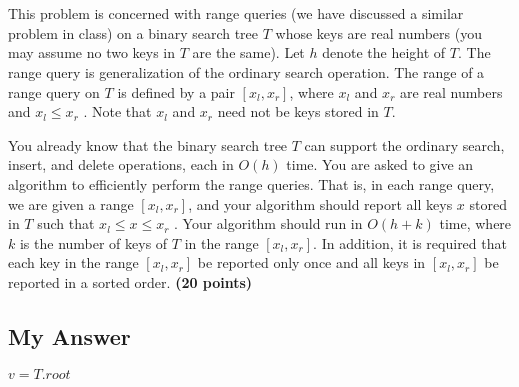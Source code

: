 \documentclass{article}
\begin{document}
\section{}

 This problem is concerned with range queries (we have discussed a
 similar problem in class) on a binary search tree $T$ whose keys are
 real numbers (you may assume no two keys in $T$ are the same). Let
 $h$ denote the height of $T$. The range query is generalization of
 the ordinary search operation. The range of a range query on $T$ is
 defined by a pair $[x_l ,x_r ]$, where $x_l$ and $x_r$ are real
 numbers and $x_l \le x_r$ . Note that $x_l$ and $x_r$ need not be
 keys stored in $T$. 

You already know that the binary search tree $T$ can support the
ordinary search, insert, and delete operations, each in $O(h)$
time. You are asked to give an algorithm to efficiently perform the
range queries. That is, in each range query, we are given a range
$[x_l ,x_r ]$, and your algorithm should report all keys $x$ stored in
$T$ such that $x_l \le x \le x_r$ . Your algorithm should run in $O(h
+ k)$ time, where $k$ is the number of keys of $T$ in the range $[x_l
,x_r ]$. In addition, it is required that each key in the range $[x_l
,x_r ]$ be reported only once and all keys in $[x_l ,x_r ]$ be
reported in a sorted order. {\bf (20 points)}

\subsection{My Answer}

{\singlespacing
\begin{algorithmic}
  \State $v = T.root$
  \State {}
\EndFunction
\end{algorithmic}
\begin{algorithmic}
  \EndIf
    \State {}
  \EndIf

    \State {}
  \EndIf

    \State {}
  \EndIf
\EndProcedure
\end{algorithmic}
}
\end{document}
